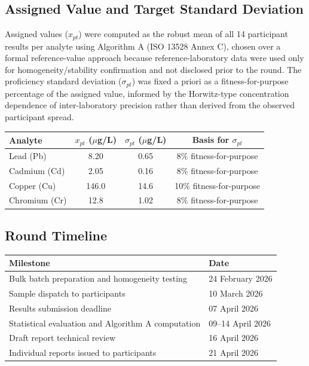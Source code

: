 \subsection{Assigned Value and Target Standard Deviation}
Assigned values (\(x_{pt}\)) were computed as the robust mean of all 14 participant results per
analyte using Algorithm A (ISO 13528 Annex C), chosen over a formal reference-value approach
because reference-laboratory data were used only for homogeneity/stability confirmation and not
disclosed prior to the round. The proficiency standard deviation (\(\sigma_{pt}\)) was fixed a
priori as a fitness-for-purpose percentage of the assigned value, informed by the Horwitz-type
concentration dependence of inter-laboratory precision \cite{horwitz1980method} rather than
derived from the observed participant spread.

\begin{center}
\small
\begin{tabular}{@{}lccc@{}}
\toprule
\textbf{Analyte} & \(x_{pt}\) \textbf{(\(\mu\)g/L)} & \(\sigma_{pt}\) \textbf{(\(\mu\)g/L)} & \textbf{Basis for \(\sigma_{pt}\)} \\
\midrule
Lead (Pb)     & 8.20  & 0.65 & 8\% fitness-for-purpose \\
Cadmium (Cd)  & 2.05  & 0.16 & 8\% fitness-for-purpose \\
Copper (Cu)   & 146.0 & 14.6 & 10\% fitness-for-purpose \\
Chromium (Cr) & 12.8  & 1.02 & 8\% fitness-for-purpose \\
\bottomrule
\end{tabular}
\end{center}

\subsection{Round Timeline}
\begin{center}
\small
\begin{tabular}{@{}ll@{}}
\toprule
\textbf{Milestone} & \textbf{Date} \\
\midrule
Bulk batch preparation and homogeneity testing & 24 February 2026 \\
Sample dispatch to participants & 10 March 2026 \\
Results submission deadline & 07 April 2026 \\
Statistical evaluation and Algorithm A computation & 09--14 April 2026 \\
Draft report technical review & 16 April 2026 \\
Individual reports issued to participants & 21 April 2026 \\
\bottomrule
\end{tabular}
\end{center}
